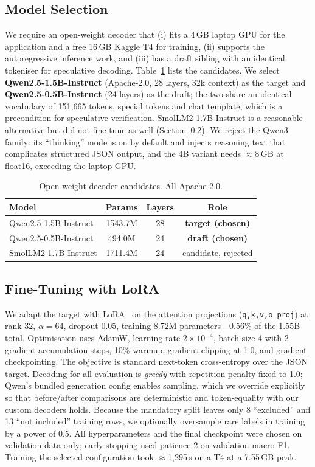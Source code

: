 \documentclass[conference]{IEEEtran}
\begin{document}
\subsection{Model Selection}
\label{sec:model}
We require an open-weight decoder that (i) fits a 4\,GB laptop GPU for the
application and a free 16\,GB Kaggle T4 for training, (ii) supports the
autoregressive inference work, and (iii) has a draft sibling with an identical
tokeniser for speculative decoding. Table~\ref{tab:models} lists the candidates.
We select \textbf{Qwen2.5-1.5B-Instruct} (Apache-2.0, 28 layers, 32k context) as
the target and \textbf{Qwen2.5-0.5B-Instruct} (24 layers) as the draft; the two
share an identical vocabulary of 151{,}665 tokens, special tokens and chat
template, which is a precondition for speculative verification.
SmolLM2-1.7B-Instruct is a reasonable alternative but did not fine-tune as well
(Section~\ref{sec:ft}). We reject the Qwen3 family: its ``thinking'' mode is on
by default and injects reasoning text that complicates structured JSON output,
and the 4B variant needs $\approx$8\,GB at float16, exceeding the laptop GPU.

\begin{table}[t]
\caption{Open-weight decoder candidates. All Apache-2.0.}
\label{tab:models}
\centering
\begin{tabular}{lccc}
\toprule
Model & Params & Layers & Role \\
\midrule
Qwen2.5-1.5B-Instruct & 1543.7M & 28 & \textbf{target (chosen)} \\
Qwen2.5-0.5B-Instruct & 494.0M  & 24 & \textbf{draft (chosen)} \\
SmolLM2-1.7B-Instruct & 1711.4M & 24 & candidate, rejected \\
\bottomrule
\end{tabular}
\end{table}

\subsection{Fine-Tuning with LoRA}
\label{sec:ft}
We adapt the target with LoRA~\cite{hu2022lora} on the attention projections
(\texttt{q,k,v,o\_proj}) at rank 32, $\alpha{=}64$, dropout 0.05, training
8.72M parameters---0.56\% of the 1.55B total. Optimisation uses AdamW,
learning rate $2{\times}10^{-4}$, batch size 4 with 2 gradient-accumulation
steps, 10\% warmup, gradient clipping at 1.0, and gradient checkpointing. The
objective is standard next-token cross-entropy over the JSON target. Decoding for
all evaluation is \emph{greedy} with repetition penalty fixed to 1.0; Qwen's
bundled generation config enables sampling, which we override explicitly so that
before/after comparisons are deterministic and token-equality with our custom
decoders holds. Because the mandatory split leaves only 8 ``excluded'' and 13
``not included'' training rows, we optionally oversample rare labels in training
by a power of 0.5. All hyperparameters and the final checkpoint were chosen on
validation data only; early stopping used patience 2 on validation macro-F1.
Training the selected configuration took $\approx$1{,}295\,s on a T4 at a 7.55\,GB
peak.
\end{document}
